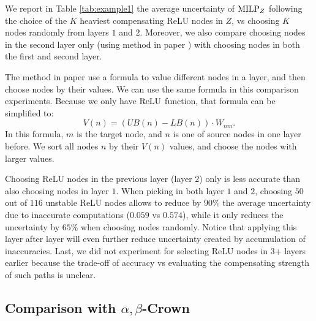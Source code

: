 {\color{red} We report in Table \ref{tab:example1} the average uncertainty of ${\textrm{MILP}}_Z$ following the choice of the $K$ heaviest compensating ReLU nodes in $Z$, vs choosing $K$ nodes randomly from layers $1$ and $2$. 
	Moreover, we also compare choosing nodes in the second layer only (using method in paper \cite{ DivideAndSlide}) with choosing nodes in both the first and second layer.
	
	
		The method in paper \cite{ DivideAndSlide} use a formula to value different nodes in a layer, and then choose nodes by their values. We can use the same formula in this comparison experiments. Because we only have $\mathrm{ReLU}$ function, that formula can be simplified to: $$V(n) = (UB(n)-LB(n))\cdot W_{nm}.$$ In this formula, $m$ is the target node, and $n$ is one of source nodes in one layer before. We sort all nodes $n$ by their $V(n)$ values, and choose the nodes with larger values. 
	
	
	
	Choosing ReLU nodes in the previous layer (layer $2$) only is less accurate than 
	also choosing nodes in layer $1$. 	When picking in both layer $1$ and $2$, choosing $50$ out of $116$ unstable ReLU nodes allows to reduce by $90\%$ the average uncertainty due to inaccurate computations ($0.059$ vs $0.574$), while it only reduces the uncertainty by $65\%$ when choosing nodes randomly. Notice that applying this layer after layer will even further reduce uncertainty created by accumulation of inaccuracies. 
	Last, we did not experiment for selecting ReLU nodes in 3+ layers earlier because the trade-off of accuracy vs evaluating the compensating strength of such paths is unclear. 
	
}
\fi










\subsection{Comparison with $\alpha,\beta$-Crown}


